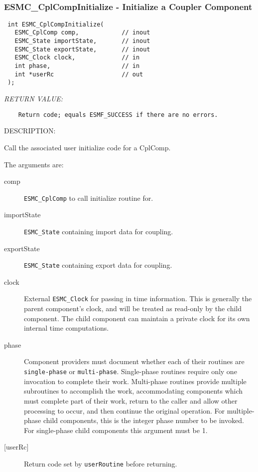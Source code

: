 \mbox{}\hrulefill\ 
 
\subsubsection [ESMC\_CplCompInitialize] {ESMC\_CplCompInitialize - Initialize a Coupler Component}


  
\begin{verbatim} int ESMC_CplCompInitialize(
   ESMC_CplComp comp,            // inout
   ESMC_State importState,       // inout
   ESMC_State exportState,       // inout 
   ESMC_Clock clock,             // in
   int phase,                    // in
   int *userRc                   // out
 );\end{verbatim}{\em RETURN VALUE:}
\begin{verbatim}    Return code; equals ESMF_SUCCESS if there are no errors.\end{verbatim}
{\sf DESCRIPTION:\\ }


  
    Call the associated user initialize code for a CplComp.
  
    The arguments are:
    \begin{description}
    \item[comp]
      {\tt ESMC\_CplComp} to call initialize routine for.
    \item[importState]
      {\tt ESMC\_State} containing import data for coupling.
    \item[exportState]
      {\tt ESMC\_State} containing export data for coupling.
    \item[clock]
      External {\tt ESMC\_Clock} for passing in time information. This is 
      generally the parent component's clock, and will be treated as read-only
      by the child component. The child component can maintain a private clock
      for its own internal time computations.
    \item[phase]
      Component providers must document whether each of their routines are 
      {\tt single-phase} or {\tt multi-phase}. Single-phase routines require 
      only one invocation to complete their work. Multi-phase routines provide
      multiple subroutines to accomplish the work, accommodating components
      which must complete part of their work, return to the caller and allow 
      other processing to occur, and then continue the original operation. 
      For multiple-phase child components, this is the integer phase number to
      be invoked. For single-phase child components this argument must be 1.
    \item[{[userRc]}]
      Return code set by {\tt userRoutine} before returning.
    \end{description}
   
